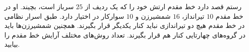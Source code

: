 \EXERCISE
رستم قصد دارد خط مقدم ارتش خود را که یک ردیف از
$25$
سرباز است، بچیند. او در خط مقدم
$10$
تیرانداز،
$16$
شمشیرزن و
$10$
سوارکار در اختیار دارد. طبق اسرار نظامی در خط مقدم هیچ دو تیراندازی نباید کنار یکدیگر قرار بگیرند. همچنین شمشیرزن‌ها باید در گروه‌های چهارتایی کنار هم قرار بگیرند. تعداد روش‌های مختلف آرایش خط مقدم را بیابید.